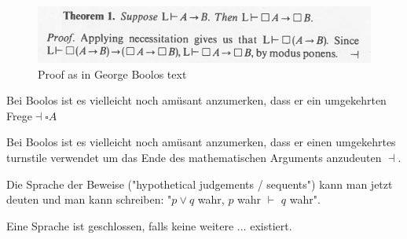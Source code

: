 \documentclass[a4paper,oneside]{article} %
\begin{document}
\begin{description}
	
\begin{figure}[h]
\centering
\includegraphics[width=.8\linewidth]{samplemodalproof.png}
\caption{Proof as in George Boolos text}
\label{fig:boolos1}
\end{figure}

Bei Boolos ist es vielleicht noch amüsant anzumerken, dass er ein umgekehrten Frege$\dashv \square A$

Bei Boolos ist es vielleicht noch amüsant anzumerken, dass er einen umgekehrtes turnstile verwendet um das Ende des mathematischen Arguments anzudeuten $\dashv$.





Die Sprache der Beweise ("hypothetical judgements / sequents") kann man jetzt deuten und man kann schreiben: "$p \vee q$ wahr, $p$ wahr $\vdash$ $q$ wahr".
	
	\end{description}
	
	Eine Sprache ist geschlossen, falls keine weitere ... existiert.
	
\end{document}
